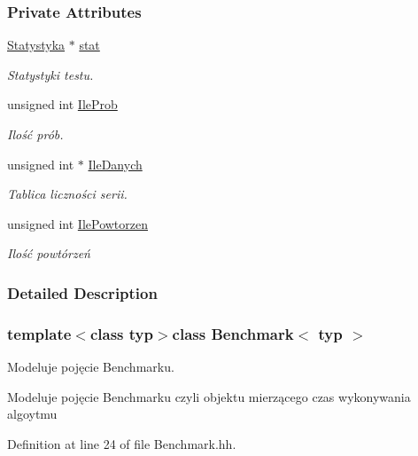 \subsubsection*{Private Attributes}
\begin{DoxyCompactItemize}
\item 
\hyperlink{class_statystyka}{Statystyka} $\ast$ \hyperlink{class_benchmark_aa808f4e600325e1ed21fcc5766ce5a8b}{stat}
\begin{DoxyCompactList}\small\item\em Statystyki testu. \end{DoxyCompactList}\item 
unsigned int \hyperlink{class_benchmark_ab53d909a3f18b43037cc18f700858d8e}{Ile\-Prob}
\begin{DoxyCompactList}\small\item\em Ilość prób. \end{DoxyCompactList}\item 
unsigned int $\ast$ \hyperlink{class_benchmark_a971e10e52bc909625093057d16b80ee9}{Ile\-Danych}
\begin{DoxyCompactList}\small\item\em Tablica liczności serii. \end{DoxyCompactList}\item 
unsigned int \hyperlink{class_benchmark_a47772159994c8b218be46062b8b81487}{Ile\-Powtorzen}
\begin{DoxyCompactList}\small\item\em Ilość powtórzeń \end{DoxyCompactList}\end{DoxyCompactItemize}


\subsubsection{Detailed Description}
\subsubsection*{template$<$class typ$>$class Benchmark$<$ typ $>$}

Modeluje pojęcie Benchmarku. 

Modeluje pojęcie Benchmarku czyli objektu mierzącego czas wykonywania algoytmu 

Definition at line 24 of file Benchmark.\-hh.



